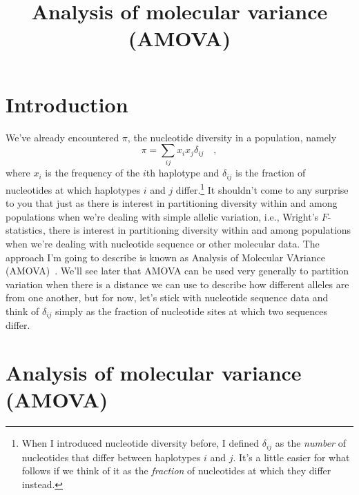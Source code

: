 \documentclass[12pt]{article}
\title{Analysis of molecular variance (AMOVA)}
\begin{document}
\maketitle

\thispagestyle{first}

\section*{Introduction}

We've already encountered $\pi$, the nucleotide diversity in a
population, namely
\[
\pi = \sum_{ij} x_ix_j \delta_{ij} \quad ,
\]
where $x_i$ is the frequency of the $i$th haplotype and $\delta_{ij}$
is the fraction of nucleotides at which haplotypes $i$ and $j$
differ.\footnote{When I introduced nucleotide diversity before, I
  defined $\delta_{ij}$ as the {\it number\/} of nucleotides that
  differ between haplotypes $i$ and $j$. It's a little easier for what
  follows if we think of it as the {\it fraction\/} of nucleotides at
  which they differ instead.} It shouldn't come to any surprise to you
that just as there is interest in partitioning diversity within and
among populations when we're dealing with simple allelic variation,
i.e., Wright's $F$-statistics, there is interest in partitioning
diversity within and among populations when we're dealing with
nucleotide sequence or other molecular data. The approach I'm going to
describe is known as Analysis of Molecular VAriance
(AMOVA)~\cite{Excoffier-etal92}. We'll see later that AMOVA can be
used very generally to partition variation when there is a distance we
can use to describe how different alleles are from one another, but
for now, let's stick with nucleotide sequence data and think of
$\delta_{ij}$ simply as the fraction of nucleotide sites at which two
sequences differ.

\section*{Analysis of molecular variance
  (AMOVA)}
\end{document}
